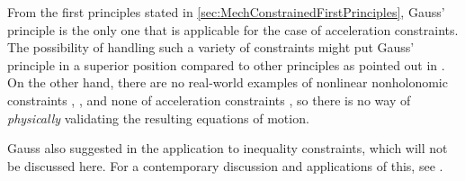 From the first principles stated in \autoref{sec:MechConstrainedFirstPrinciples}, Gauss' principle is the only one that is applicable for the case of acceleration constraints.
The possibility of handling such a variety of constraints might put Gauss' principle in a superior position compared to other principles as pointed out in \cite[p.\ 525]{Hamel:TheoretischeMechanik}.
On the other hand, there are no real-world examples of nonlinear nonholonomic constraints \cite[p.\ 499]{Hamel:TheoretischeMechanik}, \cite[ch.\ IV]{Neimark:NonholonomicSystems}, \cite[p.\ 96]{Schwertassek:MultibodySystems} and none of acceleration constraints \cite[p.\ 505 \& 525]{Hamel:TheoretischeMechanik}, so there is no way of \textit{physically} validating the resulting equations of motion.

Gauss also suggested in \cite{Gauss:Principle} the application to inequality constraints, which will not be discussed here.
For a contemporary discussion and applications of this, see \cite[sec.\ 6.1]{Pfeiffer:UnilateralContacts}.

